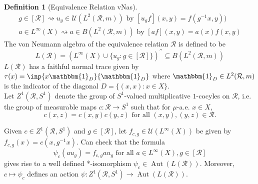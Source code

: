 \documentclass[12pt,letterpaper]{article}
\newcommand{\sub}{\subseteq}
\DeclareMathOperator{\Aut}{Aut}
\newcommand{\ind}{\mathbbm{1}}
\theoremstyle{definition}
\newtheorem{definition}{Definition}[]
\theoremstyle{plain}
\theoremstyle{remark}
\begin{document}
\begin{definition}[Equivalence Relation vNas]
    \begin{align*}
        g\in[\mathcal{R}] \rightsquigarrow u_{g}\in \mathcal{U}(L^{2}(\mathcal{R},m)) \text{ by } [u_{g}f](x,y) = f(g^{-1}x,y)) \\
        a\in L^{\infty}(X) \rightsquigarrow a\in B(L^{2}(\mathcal{R},m)) \text{ by } [af](x,y) = a(x)f(x,y) 
    \end{align*}
    The von Neumann algebra of the equivalence relation $ \mathcal{R} $ is defined to be 
    \[
        L(\mathcal{R}) = (L^{\infty}(X)\cup \{u_{g}:g\in[\mathcal{R}]\})^{\prime\prime} \sub B(L^{2}(\mathcal{R},m))
    \]
    $ L(\mathcal{R}) $ has a faithful normal trace given by $ \tau(x) = \inp{x\ind_{D}}{\ind_{D}} $ where $ \ind_{D}\in L^{2}(\mathcal{R},m)$ is the indicator of the diagonal $ D = \{(x,x): x\in X\} $.\\

    Let $ Z^{1}(\mathcal{R}, S^{1}) $ denote the group of $ S^{1} $-valued multiplicative $ 1 $-cocyles on $ \mathcal{R} $, i.e. the group of measurable maps $ c:\mathcal{R}\to S^{1} $ such that for $ \mu $-a.e. $ x\in X $,
    \[
        c(x,z) = c(x,y)c(y,z) \text{ for all }  (x,y), (y,z)\in \mathcal{R}.
    \]

    Given $ c\in Z^{1}(\mathcal{R},S^{1}) $ and $ g\in[\mathcal{R}] $, let $ f_{c,g}\in \mathcal{U}(L^{\infty}(X)) $ be given by $ f_{c,g}(x) = c(x,g^{-1}x) $. Can check that the formula 
    \[
        \psi_{c}(au_{g}) = f_{c,g}au_{g} \text{ for all } a\in L^{\infty}(X), g\in [\mathcal{R}]
    \]
    gives rise to a well defined *-isomorphism $ \psi_{c}\in \Aut(L(\mathcal{R})) $. Moreover, $ c\mapsto \psi_{c} $ defines an action $ \psi:Z^{1}(\mathcal{R},S^{1}) \to \Aut(L(\mathcal{R})) $.
\end{definition}
\end{document}
